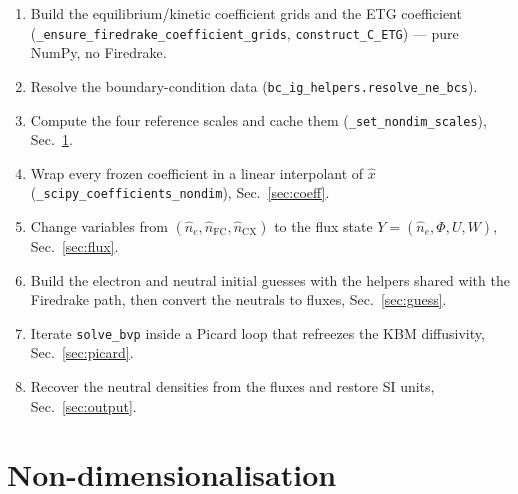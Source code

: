 \documentclass[11pt]{article}
\newcommand{\hn}{\hat{n}}
\newcommand{\hx}{\hat{x}}
\newcommand{\code}[1]{\texttt{#1}}
\begin{document}
\begin{enumerate}
  \item Build the equilibrium/kinetic coefficient grids and the ETG
        coefficient (\code{\_ensure\_firedrake\_coefficient\_grids},
        \code{construct\_C\_ETG}) --- pure NumPy, no Firedrake.
  \item Resolve the boundary-condition data
        (\code{bc\_ig\_helpers.resolve\_ne\_bcs}).
  \item Compute the four reference scales and cache them
        (\code{\_set\_nondim\_scales}), Sec.~\ref{sec:nondim}.
  \item Wrap every frozen coefficient in a linear interpolant of $\hx$
        (\code{\_scipy\_coefficients\_nondim}), Sec.~\ref{sec:coeff}.
  \item Change variables from $(\hn_e, \hn_{\mathrm{FC}},
        \hn_{\mathrm{CX}})$ to the flux state
        $Y = (\hn_e, \Phi, U, W)$, Sec.~\ref{sec:flux}.
  \item Build the electron and neutral initial guesses with the helpers
        shared with the Firedrake path, then convert the neutrals to
        fluxes, Sec.~\ref{sec:guess}.
  \item Iterate \code{solve\_bvp} inside a Picard loop that refreezes the
        KBM diffusivity, Sec.~\ref{sec:picard}.
  \item Recover the neutral densities from the fluxes and restore SI
        units, Sec.~\ref{sec:output}.
\end{enumerate}

\section{Non-dimensionalisation}
\label{sec:nondim}
\end{document}
